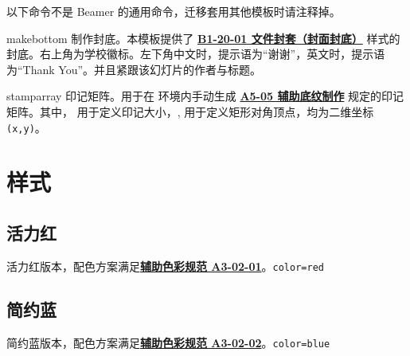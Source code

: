\documentclass[a4paper,12pt]{article}
\begin{document}
\begin{CJK}{UTF8}{song}
以下命令不是 \textsf{Beamer} 的通用命令，迁移套用其他模板时请注释掉。

\begin{docCommand*}[]{makebottom}{}
    制作封底。本模板提供了 \href{https://vi.sjtu.edu.cn/index.php/articles/app/7}{\textbf{B1-20-01 文件封套（封面封底）}} 样式的封底。右上角为学校徽标。左下角中文时，提示语为“谢谢”，英文时，提示语为``Thank You''。并且紧跟该幻灯片的作者与标题。
\end{docCommand*}

\begin{docCommand*}[]{stamparray}{}
    印记矩阵。用于在  环境内手动生成 \href{http://vi.sjtu.edu.cn/index.php/articles/base/5}{\textbf{A5-05 辅助底纹制作}} 规定的印记矩阵。其中， 用于定义印记大小，, 用于定义矩形对角顶点，均为二维坐标 \verb"(x,y)"。 
\end{docCommand*}

\newpage
\section{样式}

\subsection{活力红}

活力红版本，配色方案满足\href{http://vi.sjtu.edu.cn/index.php/articles/base/3}{\textbf{辅助色彩规范 A3-02-01}}。\hfill\texttt{color=red}

\begin{tcbraster}[raster columns=3,colframe=red,colback=white,
    colbacktitle=red!50!white,fonttitle=\small\bfseries\ttfamily,
    left=0pt,right=0pt,top=0pt,bottom=0pt,boxsep=0pt,boxrule=0.6pt,
    toptitle=1mm,bottomtitle=1mm,drop lifted shadow,center title,
    graphics pages={1,...,12}]
\end{tcbraster}

\clearpage
\subsection{简约蓝}

简约蓝版本，配色方案满足\href{http://vi.sjtu.edu.cn/index.php/articles/base/3}{\textbf{辅助色彩规范 A3-02-02}}。\hfill \texttt{color=blue}

\begin{tcbraster}[raster columns=3,colframe=blue,colback=white,
    colbacktitle=blue!50!white,fonttitle=\small\bfseries\ttfamily,
    left=0pt,right=0pt,top=0pt,bottom=0pt,boxsep=0pt,boxrule=0.6pt,
    toptitle=1mm,bottomtitle=1mm,drop lifted shadow,center title,
    graphics pages={1,...,12}]
\end{tcbraster}


\end{CJK}
\end{document}
